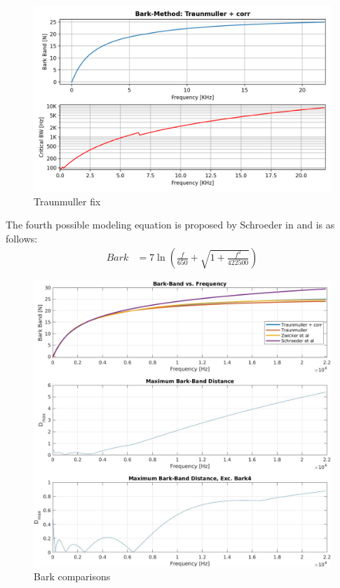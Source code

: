 \begin{figure}[H]
    \centering
    \includegraphics[width=0.75\linewidth]{Experiments/images/Traunmuller_fix}
    \caption{Traunmuller fix}\label{fig:Traunmuller_fix}
\end{figure}

The fourth possible modeling equation is proposed by
Schroeder in \cite{SchroederScale} and is as follows:
\begin{align}
    Bark & = 7\ln \left( \frac{f}{650} + \sqrt{1 + \frac{f^{2}}{422500} }  \right)
\end{align}


\begin{figure}[H]
    \centering
    \includegraphics[width=0.75\linewidth]{Experiments/images/bark_comparison}
    \caption{Bark comparisons}\label{fig:bark_comparison}
\end{figure}


